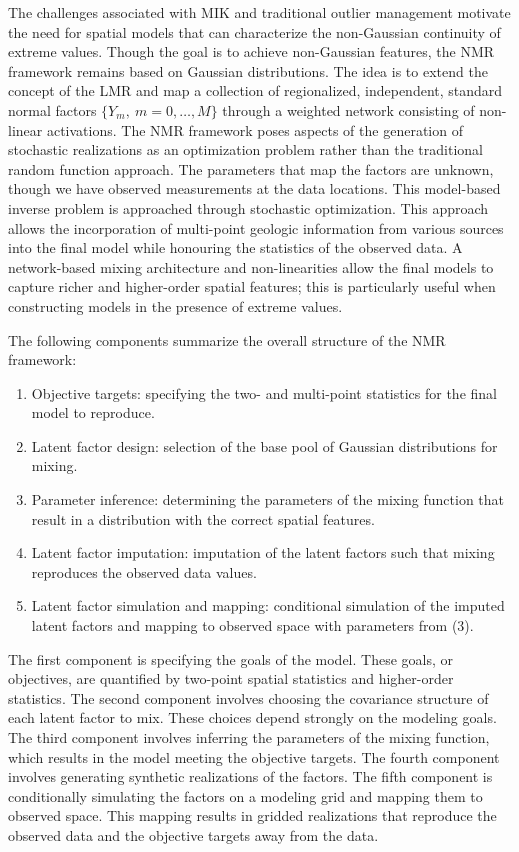 The challenges associated with \gls{MIK} and traditional outlier management motivate the need for spatial models that can characterize the non-Gaussian continuity of extreme values. Though the goal is to achieve non-Gaussian features, the \gls{NMR} framework remains based on Gaussian distributions. The idea is to extend the concept of the \gls{LMR} and map a collection of regionalized, independent, standard normal factors $\{ Y_{m}, \ m = 0, \dots, M\}$ through a weighted network consisting of non-linear activations. The \gls{NMR} framework poses aspects of the generation of stochastic realizations as an optimization problem rather than the traditional random function approach. The parameters that map the factors are unknown, though we have observed measurements at the data locations. This model-based inverse problem is approached through stochastic optimization. This approach allows the incorporation of multi-point geologic information from various sources into the final model while honouring the statistics of the observed data. A network-based mixing architecture and non-linearities allow the final models to capture richer and higher-order spatial features; this is particularly useful when constructing models in the presence of extreme values.

The following components summarize the overall structure of the \gls{NMR} framework:
\begin{enumerate}[noitemsep]
    \item Objective targets: specifying the two- and multi-point statistics for the final model to reproduce.
    \item Latent factor design: selection of the base pool of Gaussian distributions for mixing.
    \item Parameter inference: determining the parameters of the mixing function that result in a distribution with the correct spatial features.
    \item Latent factor imputation: imputation of the latent factors such that mixing reproduces the observed data values.
    \item Latent factor simulation and mapping: conditional simulation of the imputed latent factors and mapping to observed space with parameters from (3).
\end{enumerate}

The first component is specifying the goals of the model. These goals, or objectives, are quantified by two-point spatial statistics and higher-order statistics. The second component involves choosing the covariance structure of each latent factor to mix. These choices depend strongly on the modeling goals. The third component involves inferring the parameters of the mixing function, which results in the model meeting the objective targets. The fourth component involves generating synthetic realizations of the factors. The fifth component is conditionally simulating the factors on a modeling grid and mapping them to observed space. This mapping results in gridded realizations that reproduce the observed data and the objective targets away from the data.

